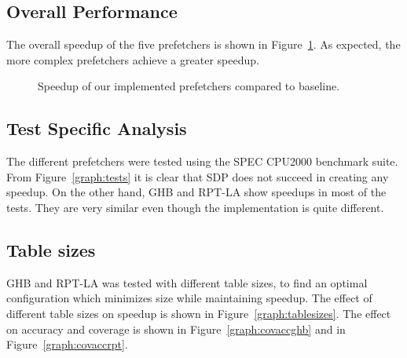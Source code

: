 \subsection{Overall Performance}
The overall speedup of the five prefetchers is shown in
Figure~\ref{graph:base}. As expected, the more complex prefetchers
achieve a greater speedup.
\begin{figure}[h]
    \caption{Speedup of our implemented prefetchers compared to baseline.}
    \label{graph:base}
\end{figure}

\subsection{Test Specific Analysis}
The different prefetchers were tested using the SPEC CPU2000 benchmark
suite. From Figure~\ref{graph:tests} it is clear that SDP does not
succeed in creating any speedup. On the other hand, GHB and RPT-LA
show speedups in most of the tests.  They are very similar even though
the implementation is quite different.

\subsection{Table sizes}
GHB and RPT-LA was tested with different table sizes, to find an optimal
configuration which minimizes size while maintaining speedup. The
effect of different table sizes on speedup is shown in
Figure~\ref{graph:tablesizes}. The effect on accuracy and coverage is
shown in Figure~\ref{graph:covaccghb} and in Figure~\ref{graph:covaccrpt}.

